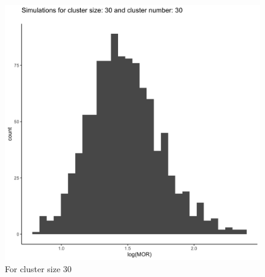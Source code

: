 \documentclass[
  letterpaper,
  DIV=11,
  numbers=noendperiod,
  titlepage]{scrartcl}
\begin{document}
\begin{figure}
\begin{minipage}[t]{0.50\linewidth}
{{\includegraphics{../plots/ran-int/hist_30_30.png}

}

\caption{For cluster size 30}

}

\end{minipage}%
%
\begin{minipage}[t]{0.50\linewidth}

{\centering 

}
\end{minipage}
\end{figure}
\end{document}
